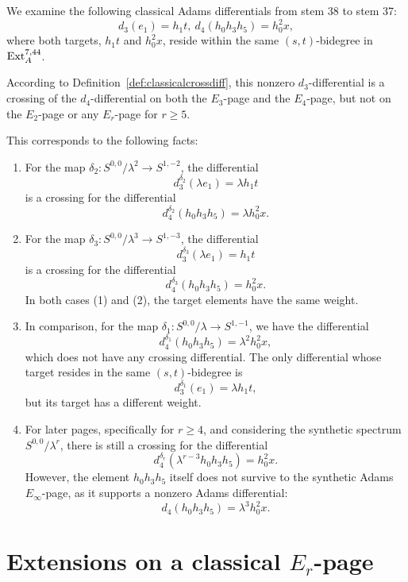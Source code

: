 \documentclass{amsart}
\numberwithin{equation}{section}
\begin{document}
\begin{example} \label{exam:classcrossdiff}
    We examine the following classical Adams differentials from stem 38 to stem 37:
    $$d_3(e_1) = h_1 t, \ d_4(h_0h_3h_5) = h_0^2 x,$$
    where both targets, $h_1 t$ and $h_0^2 x$, reside within the same $(s,t)$-bidegree in $\mathrm{Ext}_A^{7,44}$.

    According to Definition~\ref{def:classicalcrossdiff}, this nonzero $d_3$-differential is a crossing of the $d_4$-differential on both the $E_3$-page and the $E_4$-page, but not on the $E_2$-page or any $E_r$-page for $r \ge 5$.

    This corresponds to the following facts: 
    \begin{enumerate}
        \item For the map $\delta_2: S^{0,0}/\lambda^2 \rightarrow S^{1,-2}$, the differential
        $$d_3^{\delta_2} (\lambda e_1) = \lambda h_1 t$$
        is a crossing for the differential
        $$d_4^{\delta_2} (h_0h_3h_5) = \lambda h_0^2 x.$$

        \item For the map $\delta_3: S^{0,0}/\lambda^3 \rightarrow S^{1,-3}$, the differential
        $$d_3^{\delta_3} (\lambda e_1) = h_1 t$$
        is a crossing for the differential
        $$d_4^{\delta_3} (h_0h_3h_5) = h_0^2 x.$$
        In both cases (1) and (2), the target elements have the same weight. 

        \item In comparison, for the map $\delta_1: S^{0,0}/\lambda \rightarrow S^{1,-1}$, we have the differential
        $$d_4^{\delta_1} (h_0h_3h_5) = \lambda^2 h_0^2 x,$$
        which does not have any crossing differential. The only differential whose target resides in the same $(s,t)$-bidegree is 
        $$d_3^{\delta_1} (e_1) = \lambda h_1 t,$$
        but its target has a different weight. 

        \item For later pages, specifically for $r \ge 4$, and considering the synthetic spectrum $S^{0,0}/\lambda^r$, there is still a crossing for the differential
        $$d_4^{\delta_r} (\lambda^{r-3} h_0h_3h_5) = h_0^2 x.$$
        However, the element $h_0h_3h_5$ itself does not survive to the synthetic Adams $E_\infty$-page, as it supports a nonzero Adams differential:
        $$d_4 (h_0h_3h_5) = \lambda^3 h_0^2 x.$$
    \end{enumerate}
\end{example}

\section{Extensions on a classical $E_r$-page} \label{sec:extenpage}
\end{document}
